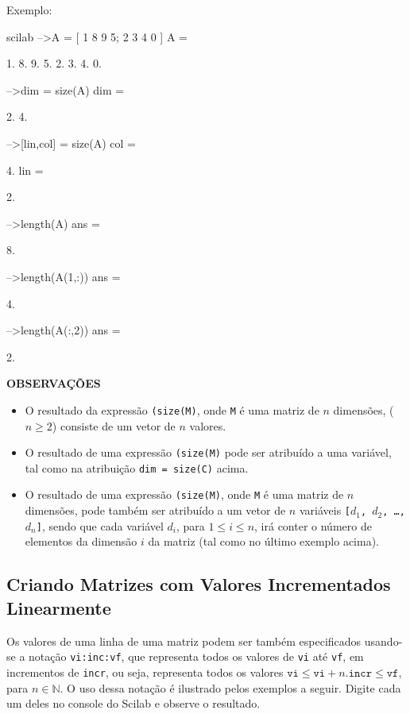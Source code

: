 \documentclass[11pt,fleqn]{practice}
\begin{document}
Exemplo:
\begin{lst}{scilab}
-->A = [ 1 8 9 5; 2 3 4 0 ]
 A  =
 
    1.    8.    9.    5.  
    2.    3.    4.    0.  

-->dim = size(A)
 dim  =
 
      2.    4.  
 
-->[lin,col] = size(A)
 col  =
 
    4.  
 lin  =
 
    2.  

-->length(A)
 ans  =

     8.

-->length(A(1,:))
 ans  =
 
      4.

-->length(A(:,2))
ans  =
 
      2.

\end{lst}


\textbf{OBSERVAÇÕES}
\begin{itemize}
\item O resultado da expressão \texttt{(size(M)}, onde \texttt{M} é uma matriz de $n$ dimensões, ($n\geq 2$) consiste de um vetor de $n$ valores.
\item O resultado de uma expressão \texttt{(size(M)} pode ser atribuído a uma variável, tal como 
na atribuição \texttt{dim = size(C)} acima.
\item O resultado de uma expressão \texttt{(size(M)}, onde \texttt{M} é uma matriz de $n$ dimensões, pode também ser atribuído a um vetor de $n$ variáveis \texttt{[$d_1$, $d_2$, \ldots, $d_n$]}, sendo que cada variável $d_i$, para $1 \leq i \leq n$, irá conter o número de elementos da dimensão $i$ da matriz (tal como no último exemplo acima).
\end{itemize}  

\pagebreak
\subsection{Criando Matrizes com Valores Incrementados Linearmente}

Os valores de uma linha de uma matriz podem ser também especificados usando-se a notação \texttt{vi:inc:vf},  que representa todos os valores de \texttt{vi} até \texttt{vf}, em incrementos de \texttt{incr}, ou seja, representa todos os valores $\texttt{vi} \leq \texttt{vi} + n .\texttt{incr} \leq \texttt{vf}$, para $n\in \mathbb{N}$. O uso dessa notação é ilustrado pelos exemplos a seguir.
Digite cada um deles no console do Scilab e observe o resultado.
\end{document}

